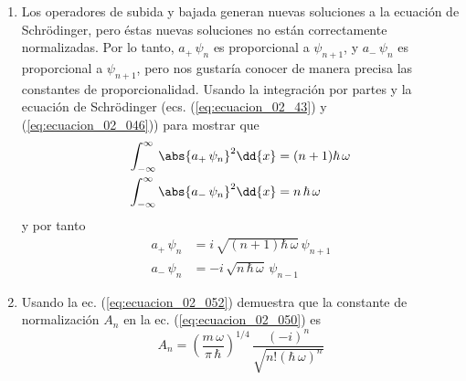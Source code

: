 \begin{enumerate}
\item Los operadores de subida y bajada generan nuevas soluciones a la ecuación de Schrödinger, pero éstas nuevas soluciones no están correctamente normalizadas. Por lo tanto, $a_{+} \, \psi_{n}$ es proporcional a $\psi_{n+1}$, y $a_{-} \,\psi_{n}$ es proporcional a $\psi_{n+1}$, pero nos gustaría conocer de manera precisa las constantes de proporcionalidad. Usando la integración por partes y la ecuación de Schrödinger (ecs. (\ref{eq:ecuacion_02_43}) y (\ref{eq:ecuacion_02_046})) para mostrar que
\begin{align*}
\int_{-\infty}^{\infty} \abs{a_{+} \, \psi_{n}}^{2} \dd{x} &= (n + 1) \hbar \, \omega \\
\int_{-\infty}^{\infty} \abs{a_{-} \, \psi_{n}}^{2} \dd{x} &= n \, \hbar \, \omega
\end{align*}
y por tanto
\begin{align}
a_{+} \, \psi_{n} &= i \, \sqrt{(n + 1) \hbar \, \omega} \, \psi_{n+1} \label{eq:ecuacion_02_052} \\
a_{-} \, \psi_{n} &= - i \, \sqrt{n \, \hbar \, \omega} \, \psi_{n-1} \label{eq:ecuacion_02_053}
\end{align}
\item Usando la ec. (\ref{eq:ecuacion_02_052}) demuestra que la constante de normalización $A_{n}$ en la ec. (\ref{eq:ecuacion_02_050}) es
\begin{equation}
A_{n} = \left( \dfrac{m \, \omega}{\pi \, \hbar} \right)^{1/4} \, \dfrac{(-i)^{n}}{\sqrt{n! (\hbar \, \omega)^{n}}}
\label{eq:ecuacion_02_054}
\end{equation}
\end{enumerate}
